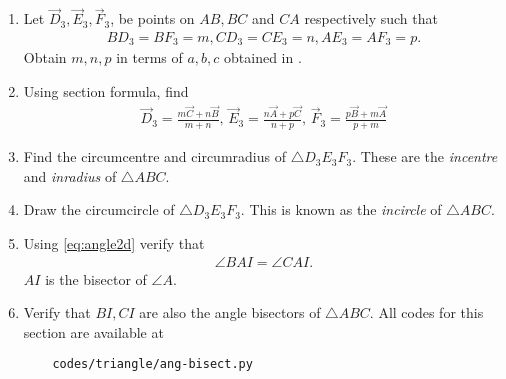 \begin{enumerate}[label=\thesubsection.\arabic*.,ref=\thesubsection.\theenumi]
	\item Let $\vec{D}_3, \vec{E}_3, \vec{F}_3$, be points on $AB, BC$ and $CA$ respectively such that
		\begin{align}
			BD_3 = BF_3=m, CD_3 = CE_3=n, AE_3 = AF_3=p.
		\end{align}
	Obtain $m,n,p$ in terms of $a,b,c$ obtained in  
		.
 \\
 		
	\item Using section formula, find 
		\begin{align}
			\vec{D}_3 = \frac{m\vec{C}+n\vec{B}}{m+n},\,
			\vec{E}_3 = \frac{n\vec{A}+p\vec{C}}{n+p},\,
			\vec{F}_3 = \frac{p\vec{B}+m\vec{A}}{p+m}
		\end{align}
	\item Find the circumcentre and circumradius of $\triangle D_3E_3F_3$.  These are the {\em incentre} and {\em inradius} of $\triangle ABC$.
	\item Draw the circumcircle of $\triangle D_3E_3F_3$.  This is known as the {\em incircle} of $\triangle ABC$.
		\\
 		
	\item Using 
    \eqref{eq:angle2d}
verify that 
		\begin{align}
			\angle BAI = \angle CAI.
		\end{align}
		$AI$ is the bisector of $\angle A$.  
	\item Verify that $BI, CI$ are also the angle bisectors of $\triangle ABC$.
All codes for this section are available at
\begin{lstlisting}
	codes/triangle/ang-bisect.py
\end{lstlisting}

\end{enumerate}
